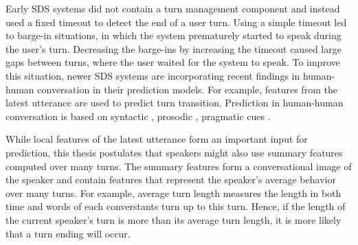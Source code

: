 Early SDS systems did not contain a turn management component and instead used a fixed timeout to detect the end of a user turn. Using a simple timeout led to barge-in situations, in which the system prematurely started to speak during the user's turn. Decreasing the barge-ins by increasing the timeout caused large gaps between turns, where the user waited for the system to speak.
To improve this situation, newer SDS systems are incorporating recent findings in human-human conversation in their prediction models. For example, features from the latest utterance are used to predict turn transition. Prediction in human-human conversation is based on syntactic \cite{sacks1974simplest,de2006projecting}, prosodic  \cite{ford1996interactional,stolcke2002speaker,ferrer2003prosody}, pragmatic cues  \cite{ford2001intersection}.

While local features of the latest utterance form an important input for prediction, this thesis postulates that speakers might also use summary features computed over many turns. The summary features form a conversational image of the speaker and contain features that represent the speaker's average behavior over many turns. For example, average turn length measures the length in both time and words of each converstants turn up to this turn. Hence, if the length of the current speaker's turn is more than its average turn length, it is more likely that a turn ending will occur.






